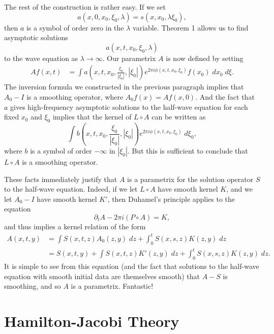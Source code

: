 \documentclass{article}
\theoremstyle{plain}
\theoremstyle{remark}
\theoremstyle{definition}
\begin{document}
The rest of the construction is rather easy. If we set
%
\[ a(x,0,x_0,\xi_0,\lambda) = s( x, x_0, \lambda \xi_0 ), \]
%
then $a$ is a symbol of order zero in the $\lambda$ variable. Theorem 1 allows us to find asymptotic solutions
%
\[ a(x,t,x_0,\xi_0,\lambda) \]
%
to the wave equation as $\lambda \to \infty$. Our parametrix $A$ is now defined by setting
%
\begin{align*}
	Af(x,t) &= \int a \left( x, t, x_0, \frac{\xi_0}{|\xi_0|} , |\xi_0| \right) e^{2 \pi i \phi(x,t,x_0,\xi_0)} f(x_0)\; dx_0\; d\xi.
\end{align*}
%
The inversion formula we constructed in the previous paragraph implies that $A_0 - I$ is a smoothing operator, where $A_0 f(x) = Af(x,0)$. And the fact that $a$ gives high-frequency asymptotic solutions to the half-wave equation for each fixed $x_0$ and $\xi_0$ implies that the kernel of $L \circ A$ can be written as
%
\[ \int b \left( x, t, x_0, \frac{\xi_0}{|\xi_0|} , |\xi_0| \right) e^{2 \pi i \phi(x,t,x_0,\xi_0)}\; d\xi_0, \]
%
where $b$ is a symbol of order $-\infty$ in $|\xi_0|$. But this is sufficient to conclude that $L \circ A$ is a smoothing operator.

These facts immediately justify that $A$ is a parametrix for the solution operator $S$ to the half-wave equation. Indeed, if we let $L \circ A$ have smooth kernel $K$, and we let $A_0 - I$ have smooth kernel $K'$, then Duhamel's principle applies to the equation
%
\[ \partial_t A - 2 \pi i (P \circ A) = K, \]
%
and thus implies a kernel relation of the form
%
\begin{align*}
	A(x,t,y) &= \int S(x,t,z) A_0(z,y)\; dz + \int_0^t S(x,s,z) K(z,y)\; dz\\
	&= S(x,t,y) + \int S(x,t,z) K'(z,y)\; dz  + \int_0^t S(x,s,z) K(z,y)\; dz.
\end{align*}
%
It is simple to see from this equation (and the fact that solutions to the half-wave equation with smooth initial data are themselves smooth) that $A - S$ is smoothing, and so $A$ is a parametrix. Fantastic!

\section{Hamilton-Jacobi Theory}
\end{document}
